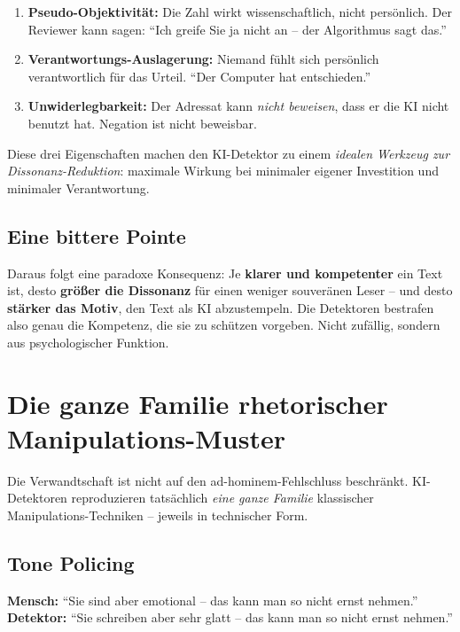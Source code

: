 \begin{enumerate}[leftmargin=2em,itemsep=2pt,topsep=2pt]
  \item \textbf{Pseudo-Objektivität:} Die Zahl wirkt wissenschaftlich,
        nicht persönlich. Der Reviewer kann sagen: \enquote{Ich
        greife Sie ja nicht an -- der Algorithmus sagt das.}
  \item \textbf{Verantwortungs-Auslagerung:} Niemand fühlt sich
        persönlich verantwortlich für das Urteil. \enquote{Der
        Computer hat entschieden.}
  \item \textbf{Unwiderlegbarkeit:} Der Adressat kann \emph{nicht
        beweisen}, dass er die KI nicht benutzt hat. Negation ist
        nicht beweisbar.
\end{enumerate}

Diese drei Eigenschaften machen den KI-Detektor zu einem
\emph{idealen Werkzeug zur Dissonanz-Reduktion}: maximale Wirkung
bei minimaler eigener Investition und minimaler Verantwortung.

\subsection{Eine bittere Pointe}

Daraus folgt eine paradoxe Konsequenz: Je \textbf{klarer und
kompetenter} ein Text ist, desto \textbf{größer die Dissonanz} für
einen weniger souveränen Leser -- und desto \textbf{stärker das
Motiv}, den Text als KI abzustempeln. Die Detektoren bestrafen also
genau die Kompetenz, die sie zu schützen vorgeben. Nicht zufällig,
sondern aus psychologischer Funktion.

\section{Die ganze Familie rhetorischer Manipulations-Muster}

Die Verwandtschaft ist nicht auf den ad-hominem-Fehlschluss
beschränkt. KI-Detektoren reproduzieren tatsächlich \emph{eine ganze
Familie} klassischer Manipulations-Techniken -- jeweils in
technischer Form.

\subsection{Tone Policing}
\textbf{Mensch:} \enquote{Sie sind aber emotional -- das kann man
so nicht ernst nehmen.}\\
\textbf{Detektor:} \enquote{Sie schreiben aber sehr glatt -- das
kann man so nicht ernst nehmen.}

